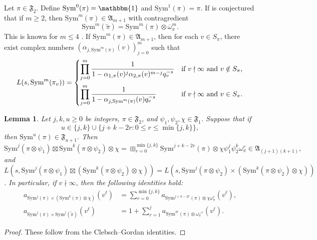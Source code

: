 \documentclass[11pt]{amsart}
\newtheorem{lemma}[theorem]{Lemma}
\theoremstyle{remark}
\numberwithin{equation}{section}
\begin{document}
Let $\pi\in\mathfrak{F}_{2}$.  Define $\mathrm{Sym}^0(\pi)=\mathbbm{1}$ and $\mathrm{Sym}^1(\pi)=\pi$.  If is conjectured that if $m\geq 2$, then $\mathrm{Sym}^{m}(\pi)\in\mathfrak{A}_{m+1}$ with contragredient
\[
\mathrm{Sym}^{m}(\widetilde{\pi})=\mathrm{Sym}^{m}(\pi)\otimes\overline{\omega}_{\pi}^{m}.
\]
This is known for $m\leq 4$ \cite{GJ,KimShahidi,Kim}.  If $\mathrm{Sym}^{m}(\pi)\in\mathfrak{A}_{m+1}$, then for each $v\in S_{\pi}$, there exist complex numbers $(\alpha_{j,\mathrm{Sym}^{m}(\pi)}(v))_{j=0}^{m}$ such that
\begin{equation}
\label{eqn:symm_power_def}
L(s,\mathrm{Sym}^m(\pi_v))=\begin{cases}
\displaystyle\prod_{j=0}^m \frac{1}{1-\alpha_{1,\pi}(v)^{j}\alpha_{2,\pi}(v)^{m-j}q_v^{-s}}&\mbox{if $v\nmid\infty$ and $v\notin S_{\pi}$,}\vspace{2mm}\\
\displaystyle\prod_{j=0}^m\frac{1}{1-\alpha_{j,\mathrm{Sym}^{m}(\pi)}(v)q_v^{-s}}&\mbox{if $v\nmid\infty$ and $v\in S_{\pi}$.}
\end{cases}	
\end{equation}

\begin{lemma}
\label{lem:CG}
Let $j,k,u\geq 0$ be integers, $\pi\in\mathfrak{F}_{2}$, and $\psi_1,\psi_2,\chi\in\mathfrak{F}_{1}$.  Suppose that if
\[
u\in\{j,k\}\cup\{j+k-2r\colon 0\leq r\leq \min\{j,k\}\},
\]
then $\mathrm{Sym}^u(\pi)\in\mathfrak{F}_{u+1}$.  Then
\[
\mathrm{Sym}^{j}(\pi\otimes\psi_1)\boxtimes\mathrm{Sym}^k(\pi\otimes\psi_2)\otimes\chi=\mathop{\boxplus}_{r=0}^{\min\{j,k\}}\mathrm{Sym}^{j+k-2r}(\pi)\otimes\chi\psi_1^j \psi_2^k\omega_{\pi}^{r}\in\mathfrak{A}_{(j+1)(k+1)},
\]
and $L(s,\mathrm{Sym}^{j}(\pi\otimes\psi_1)\boxtimes(\mathrm{Sym}^k(\pi\otimes\psi_2)\otimes\chi))=L(s,\mathrm{Sym}^{j}(\pi\otimes\psi_2)\times(\mathrm{Sym}^k(\pi\otimes\psi_2)\otimes\chi))$. In particular, if $v\nmid\infty$, then the following identities hold:
\begin{align}
a_{\mathrm{Sym}^{j}(\pi)\times(\mathrm{Sym}^k(\pi)\otimes\chi)}(v^{\ell}) &= \sum_{r=0}^{\min\{j,k\}}a_{\mathrm{Sym}^{j+k-2r}(\pi)\otimes\chi \omega_{\pi}^{r}}(v^{\ell}),\label{eqn:CG1}\\
a_{\mathrm{Sym}^{j}(\pi)\times\mathrm{Sym}^j(\widetilde{\pi})}(v^{\ell})&=1+\sum_{r=1}^j a_{\mathrm{Sym}^{2r}(\pi)\otimes\omega_{\pi}^{-r}}(v^{\ell}).\label{eqn:CG2}
\end{align}
\end{lemma}
\begin{proof}
	These follow from the Clebsch--Gordan identities.
\end{proof}
\end{document}
